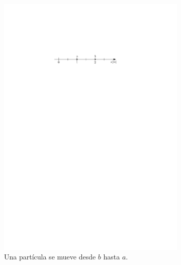 \begin{comprension}
\begin{figure}[H]
\begin{subfigure}{0.5\textwidth}
 	\includegraphics[width=.9\linewidth]{img/p_t_d_ej1.pdf}
	\caption{Una partícula se mueve desde $b$ hasta $a$.}	
\end{subfigure}
 \begin{subfigure}{0.5\textwidth}
    \centering

\end{subfigure}
\end{figure}
\end{comprension}

